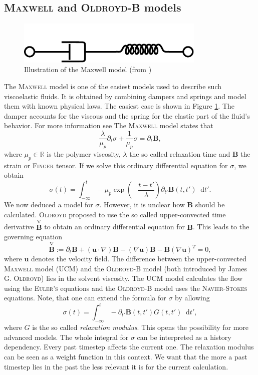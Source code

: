 \documentclass[12pt,a4paper,twoside, open=right]{scrreprt}
\theoremstyle{definition}
\theoremstyle{plain}
\newcommand{\rr}{\mathbb{R}}
\newcommand{\bfu}{\bm{u}}
\newcommand{\bfB}{\bm{B}}
\newcommand{\D}{\mathop{}\!\mathrm{d}}
\begin{document}
\subsection{\textsc{Maxwell} and \textsc{Oldroyd-B} models}
\begin{figure}
    \centering
    \includegraphics[width=0.8\textwidth]{Maxwell_diagram.pdf}
    \caption{Illustration of the Maxwell model (from \cite{Pekaje})}
    \label{fig:maxwell}
\end{figure}
The \textsc{Maxwell} model is one of the easiest models used to describe such viscoelastic fluids. It is obtained by combining dampers and springs and model them with known physical laws. The easiest case is shown in Figure \ref{fig:maxwell}. The damper accounts for the viscous  and the spring for the elastic part of the fluid's behavior. For more information see \cite{Owens2002} The \textsc{Maxwell} model states that
\begin{equation}
    \frac{\lambda}{\mu_p}\partial_t\sigma +\frac{1}{\mu_p}\sigma = \partial_t \bfB,
\end{equation}
where $\mu_p\in\rr$ is the polymer viscosity, $\lambda$ the so called relaxation time and $\bfB$ the strain or \textsc{Finger} tensor. If we solve this ordinary differential equation for $\sigma$, we obtain
\begin{equation}
    \sigma(t)=\int_{-\infty}^{t}-\mu_p\exp\left(-\frac{t-t'}{\lambda}\right)\partial_{t'} \bfB(t,t')\D t'.
\end{equation}
We now deduced a model for $\sigma$. However, it is unclear how $\bfB$ should be calculated.
\textsc{Oldroyd} proposed to use the so called upper-convected time derivative $\overset{\nabla}{\bfB}$ to obtain an ordinary differential equation for $\bfB$. This leads to the governing equation
\begin{equation}
    \overset{\nabla}{\bfB}:=\partial_t \bfB  + (\bfu\cdot \nabla)\bfB-(\nabla \bfu)\bfB-\bfB(\nabla\bfu)^T=0,
\end{equation}
where $\bfu$ denotes the velocity field. The difference between the upper-convected \textsc{Maxwell} model (UCM) and the \textsc{Oldroyd-B} model (both introduced by James G. \textsc{Oldroyd}) lies in the solvent viscosity. The UCM model calculates the flow using the \textsc{Euler's} equations and the \textsc{Oldroyd-B} model uses the \textsc{Navier-Stokes} equations. Note, that one can extend the formula for $\sigma$ by allowing
\begin{equation}
    \sigma(t)=\int_{-\infty}^{t}-\partial_{t'}\bfB(t,t')G(t,t')\D t',
\end{equation}
where $G$ is the so called \emph{relaxation modulus}. This opens the possibility for more advanced models. The whole integral for $\sigma$ can be interpreted as a history dependency. Every past timestep affects the current one. The relaxation modulus can be seen as a weight function in this context. We want that the more a past timestep lies in the past the less relevant it is for the current calculation.
\end{document}
